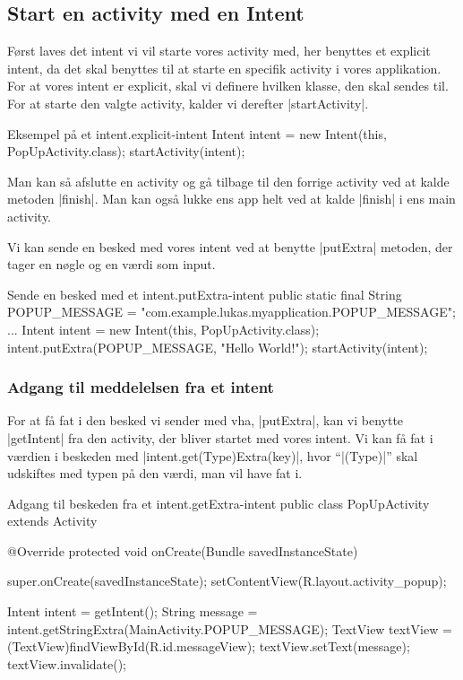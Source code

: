 \subsection{Start en activity med en Intent}

Først laves det intent vi vil starte vores activity med, her benyttes et explicit intent, da det skal benyttes til at starte en specifik activity i vores applikation. For at vores intent er explicit, skal vi definere hvilken klasse, den skal sendes til. For at starte den valgte activity, kalder vi derefter \JavaInline|startActivity|.

\begin{JavaCode}{Eksempel på et intent.}{explicit-intent}
	Intent intent = new Intent(this, PopUpActivity.class);
	startActivity(intent);
\end{JavaCode}

Man kan så afslutte en activity og gå tilbage til den forrige activity ved at kalde metoden \JavaInline|finish|. Man kan også lukke ens app helt ved at kalde \JavaInline|finish| i ens main activity.

Vi kan sende en besked med vores intent ved at benytte \JavaInline|putExtra| metoden, der tager en nøgle og en værdi som input.

\begin{JavaCode}{Sende en besked med et intent.}{putExtra-intent}
	public static final String POPUP_MESSAGE = "com.example.lukas.myapplication.POPUP_MESSAGE";
	...
	Intent intent = new Intent(this, PopUpActivity.class);
	intent.putExtra(POPUP_MESSAGE, "Hello World!");
	startActivity(intent);
\end{JavaCode}

\subsubsection{Adgang til meddelelsen fra et intent}

For at få fat i den besked vi sender med vha, \JavaInline|putExtra|, kan vi benytte \JavaInline|getIntent| fra den activity, der bliver startet med vores intent. Vi kan få fat i værdien i beskeden med \JavaInline|intent.get(Type)Extra(key)|,  hvor ``\JavaInline|(Type)|'' skal udskiftes med typen på den værdi, man vil have fat i.

\begin{JavaCode}{Adgang til beskeden fra et intent.}{getExtra-intent}
	public class PopUpActivity extends Activity {
		
		@Override
		protected void onCreate(Bundle savedInstanceState) {
			super.onCreate(savedInstanceState);
			setContentView(R.layout.activity_popup);
			
			Intent intent = getIntent();
			String message = intent.getStringExtra(MainActivity.POPUP_MESSAGE);
			TextView textView = (TextView)findViewById(R.id.messageView);
			textView.setText(message);
			textView.invalidate();
		}
	}
\end{JavaCode}

